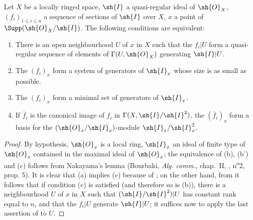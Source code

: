 \begin{corollary}[16.9.5]
\label{IV.16.9.5}
Let $X$ be a locally ringed space, $\sh{I}$ a quasi-regular ideal of $\sh{O}_X$, $(f_i)_{1 \leq i \leq n}$ a sequence of sections of $\sh{I}$ over $X$, $x$ a point of $\Supp(\sh{O}_X/\sh{I})$. 
The following conditions are equivalent:
\begin{enumerate}
  \item[(a)] There is an open neighbourhood $U$ of $x$ in $X$ such that the $f_i|U$ form a quasi-regular sequence of elements of $\Gamma(U, \sh{O}_X)$ generating $\sh{I}|U$.
  \item[(b)] The $(f_i)_x$ form a system of generators of $\sh{I}_x$ whose size is as small as possible.
  \item[(b')] The $(f_i)_x$ form a minimal set of generators of $\sh{I}_x$.
  \item[(c)] If $\bar f_i$ is the canonical image of $f_i$ in $\Gamma(X, \sh{I}/\sh{I}^2)$, the $(\bar f_i)_x$ form a basis for the $(\sh{O}_x/\sh{I}_x)$-module $\sh{I}_x/\sh{I}_x^2$.
\end{enumerate}
\end{corollary}

\begin{proof}
By hypothesis, $\sh{O}_x$ is a local ring, $\sh{I}_x$ an ideal of finite type of $\sh{O}_x$ contained in the maximal ideal of $\sh{O}_x$;
the equivalence of (b), (b') and (c) follows from Nakayama's lemma (Bourbaki, \emph{Alg. comm.}, chap.~II, , n\textsuperscript{o}2, prop. 5).
It is clear that (a) implies (c) because of ;
on the other hand, from  it follows that if condition (c) is satisfied (and therefore so is (b)), there is a neighbourhood $U$ of $x$ in $X$ such that $(\sh{I}/\sh{I}^2)|U$ has constant rank equal to $n$, and that the $f_i|U$ generate $\sh{I}|U$;
  it suffices now to apply the last assertion of  to $U$.
\end{proof}

